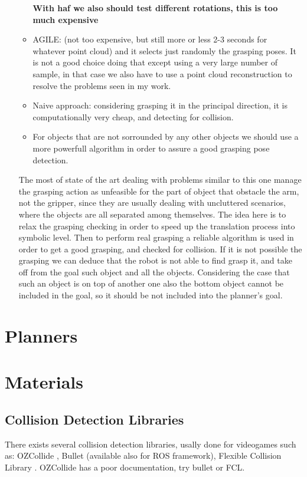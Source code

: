\begin{itemize}
\begin{itemize}
\textbf{With haf we also should test different rotations, this is too much expensive}
\item AGILE: (not too expensive, but still more or less 2-3 seconds for whatever point cloud) and it selects just randomly the grasping poses. It is not a good choice doing that except using a very large number of sample, in that case we also have to use a point cloud reconstruction to resolve the problems seen in my work. 
\item Naive approach: considering grasping it in the principal direction, it is computationally very cheap, and detecting for collision.
\item For objects that are not sorrounded by any other objects we should use a more powerfull algorithm in order to assure a good grasping pose detection.
\end{itemize} 
The most of state of the art dealing with problems similar to this one manage the grasping action as unfeasible for the part of object that obstacle the arm, not the gripper, since they are usually dealing with uncluttered scenarios, where the objects are all separated among themselves. The idea here is to relax the grasping checking in order to speed up the translation process into symbolic level. Then to perform real grasping a reliable algorithm is used in order to get a good grasping, and checked for collision. If it is not possible the grasping we can deduce that the robot is not able to find grasp it, and take off from the goal such object and all the objects. Considering the case that such an object is on top of another one also the bottom object cannot be included in the goal, so it should be not included into the planner's goal.
\end{itemize}

\section{Planners}

\section{Materials}
\subsection{Collision Detection Libraries}
There exists several collision detection libraries, usally done for videogames such as: OZCollide \citep{OZCollide}, Bullet (available also for ROS framework)\citep{Bullet}, Flexible Collision Library \citep{pan2012fcl}. OZCollide has a poor documentation, try bullet or FCL.

